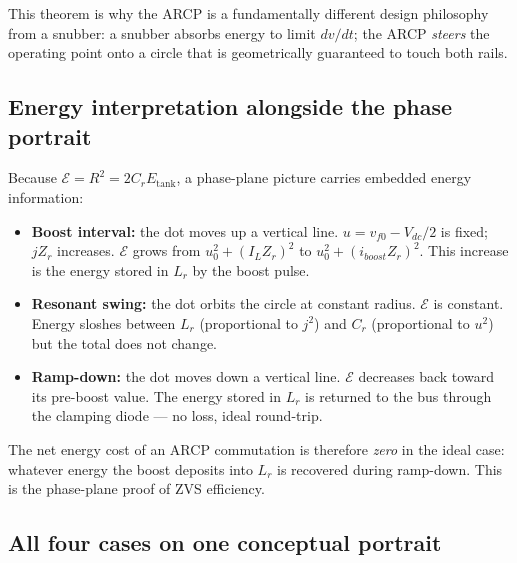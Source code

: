 \documentclass[12pt, a4paper]{article}
\newcommand{\Vdc}{V_{dc}}
\newcommand{\IL}{I_L}
\begin{document}
\noindent
This theorem is why the ARCP is a fundamentally different design philosophy
from a snubber: a snubber absorbs energy to limit $dv/dt$; the ARCP
\emph{steers} the operating point onto a circle that is geometrically
guaranteed to touch both rails.

\subsection{Energy interpretation alongside the phase portrait}
\label{ssec:pp_energy}

Because $\mathcal{E} = R^2 = 2 C_r E_\text{tank}$, a phase-plane picture
carries embedded energy information:

\begin{itemize}
    \item \textbf{Boost interval:} the dot moves up a vertical line.
          $u = v_{f0} - \Vdc/2$ is fixed; $jZ_r$ increases.
          $\mathcal{E}$ grows from $u_0^2 + (\IL Z_r)^2$ to
          $u_0^2 + (i_{boost} Z_r)^2$.
          This increase is the energy stored in $L_r$ by the boost pulse.

    \item \textbf{Resonant swing:} the dot orbits the circle at constant
          radius. $\mathcal{E}$ is constant.
          Energy sloshes between $L_r$ (proportional to $j^2$) and $C_r$
          (proportional to $u^2$) but the total does not change.

    \item \textbf{Ramp-down:} the dot moves down a vertical line.
          $\mathcal{E}$ decreases back toward its pre-boost value.
          The energy stored in $L_r$ is returned to the bus through the
          clamping diode --- no loss, ideal round-trip.
\end{itemize}

The net energy cost of an ARCP commutation is therefore \emph{zero} in
the ideal case: whatever energy the boost deposits into $L_r$ is
recovered during ramp-down.
This is the phase-plane proof of ZVS efficiency.

\subsection{All four cases on one conceptual portrait}
\label{ssec:pp_all_four}
\end{document}
